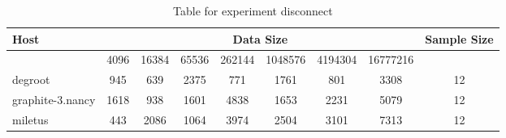\begin{table}
\caption{Table for experiment disconnect}
\begin{tabular}{@{}lcccccccc@{}}
\toprule
Host    & \multicolumn{7}{c}{Data Size}          & Sample Size \\ \midrule
& 4096  & 16384  & 65536  & 262144  & 1048576  & 4194304  & 16777216              \\ \midrule
degroot  & 945  & 639  & 2375  & 771  & 1761  & 801  & 3308  & 12 \\
graphite-3.nancy  & 1618  & 938  & 1601  & 4838  & 1653  & 2231  & 5079  & 12 \\
miletus  & 443  & 2086  & 1064  & 3974  & 2504  & 3101  & 7313  & 12 \\
\bottomrule
\end{tabular}
\end{table}